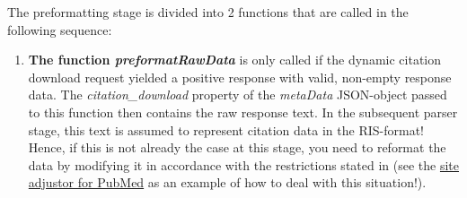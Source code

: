 \documentclass[
a4paper,
12pt,
]
{article}
\begin{document}
The preformatting stage is divided into 2 functions that are called in the following sequence:
\begin{enumerate}
 \item \textbf{The function \textit{preformatRawData}} is only called if the dynamic citation download request yielded a positive response with valid, non-empty response data. The \textit{citation\_download} property of the \textit{metaData} JSON-object passed to this function then contains the raw response text. In the subsequent parser stage, this text is assumed to represent citation data in the RIS-format! 
 Hence, if this is not already the case at this stage, you need to reformat the data by modifying it in accordance with the restrictions stated in  (see the \href{https://github.com/Langenscheiss/bibitnow/blob/master/background/preformatters/pubmed.js}{site adjustor for PubMed} as an example of how to deal with this situation!).
 

\end{enumerate}
\end{document}

